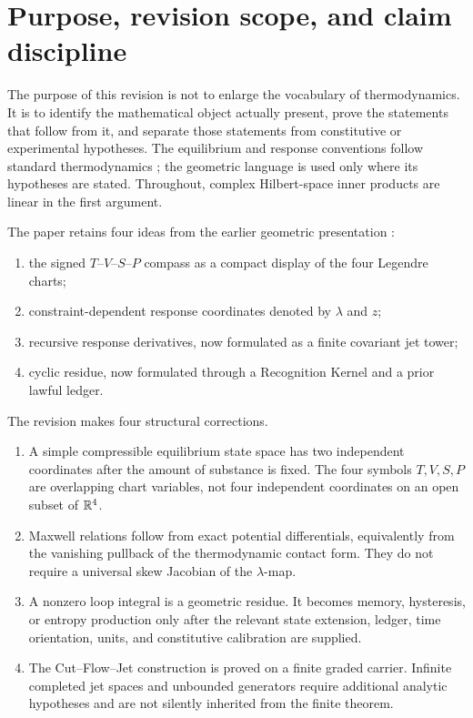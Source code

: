 \section{Purpose, revision scope, and claim discipline}

The purpose of this revision is not to enlarge the vocabulary of thermodynamics.  It is to identify the mathematical object actually present, prove the statements that follow from it, and separate those statements from constitutive or experimental hypotheses.  The equilibrium and response conventions follow standard thermodynamics \cite{Callen,deGrootMazur}; the geometric language is used only where its hypotheses are stated.  Throughout, complex Hilbert-space inner products are linear in the first argument.

The paper retains four ideas from the earlier geometric presentation \cite{DabasThermoV2}:
\begin{enumerate}[label=(\roman*)]
\item the signed $T$--$V$--$S$--$P$ compass as a compact display of the four Legendre charts;
\item constraint-dependent response coordinates denoted by $\lambda$ and $z$;
\item recursive response derivatives, now formulated as a finite covariant jet tower;
\item cyclic residue, now formulated through a Recognition Kernel and a prior lawful ledger.
\end{enumerate}

The revision makes four structural corrections.
\begin{enumerate}[label=(\roman*)]
\item A simple compressible equilibrium state space has two independent coordinates after the amount of substance is fixed.  The four symbols $T,V,S,P$ are overlapping chart variables, not four independent coordinates on an open subset of $\mathbb R^4$.
\item Maxwell relations follow from exact potential differentials, equivalently from the vanishing pullback of the thermodynamic contact form.  They do not require a universal skew Jacobian of the $\lambda$-map.
\item A nonzero loop integral is a geometric residue.  It becomes memory, hysteresis, or entropy production only after the relevant state extension, ledger, time orientation, units, and constitutive calibration are supplied.
\item The Cut--Flow--Jet construction is proved on a finite graded carrier.  Infinite completed jet spaces and unbounded generators require additional analytic hypotheses and are not silently inherited from the finite theorem.
\end{enumerate}

